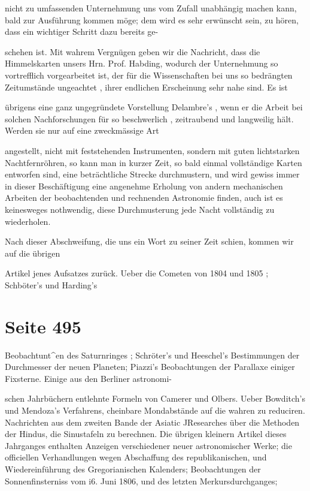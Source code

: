 \documentclass[10pt,a4paper]{article}
\begin{document}
nicht zu umfassenden Unternehmung uns vom Zufall unabhängig machen kann, bald zur Ausführung kommen möge; dem wird es sehr erwünscht sein, zu hören, dass ein wichtiger Schritt dazu bereits ge-

schehen ist. Mit wahrem Vergnügen geben wir die Nachricht, dass die Himmelskarten unsers Hrn. Prof. Habding, wodurch der Unternehmung so vortrefflich vorgearbeitet ist, der für die Wissenschaften bei uns so bedrängten Zeitumstände ungeachtet , ihrer endlichen Erscheinung sehr nahe sind. Es ist

übrigens eine ganz ungegründete Vorstellung Delambre's , wenn er die Arbeit bei solchen Nachforschungen für so beschwerlich , zeitraubend und langweilig hält. Werden sie nur auf eine zweckmässige Art

angestellt, nicht mit feststehenden Instrumenten, sondern mit guten lichtstarken Nachtfernröhren, so kann man in kurzer Zeit, so bald einmal vollständige Karten entworfen sind, eine beträchtliche Strecke durchmustern, und wird gewiss immer in dieser Beschäftigung eine angenehme Erholung von andern mechanischen Arbeiten der beobachtenden und rechnenden Astronomie finden, auch ist es keinesweges nothwendig, diese Durchmusterung jede Nacht vollständig zu wiederholen.

Nach dieser Abschweifung, die uns ein Wort zu seiner Zeit schien, kommen wir auf die übrigen

Artikel jenes Aufsatzes zurück. Ueber die Cometen von 1804 und 1805 ; Schböter's und Harding's


\newpage
\section*{Seite 495}
Beobachtunt\textasciicircum{}en des Saturnringes ; Schröter's und Heeschel's Bestimmungen der Durchmesser der neuen Planeten; Piazzi's Beobachtungen der Parallaxe einiger Fixsterne. Einige aus den Berliner astronomi-

schen Jahrbüchern entlehnte Formeln von Camerer und Olbers. Ueber Bowditch's und Mendoza's Verfahrens, cheinbare Mondabstände auf die wahren zu reduciren. Nachrichten aus dem zweiten Bande der Asiatic JResearches über die Methoden der Hindus, die Sinustafeln zu berechnen. Die übrigen kleinern Artikel dieses Jahrganges enthalten Anzeigen verschiedener neuer astronomischer Werke; die officiellen Verhandlungen wegen Abschaffung des republikanischen, und Wiedereinführung des Gregorianischen Kalenders; Beobachtungen der Sonnenfinsterniss vom i6. Juni 1806, und des letzten Merkursdurchganges;
\end{document}
